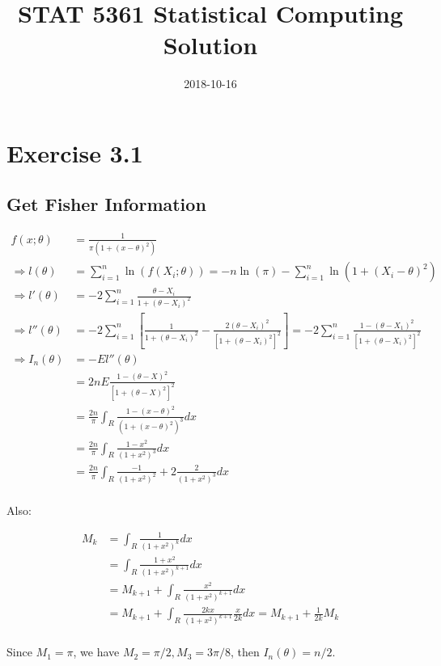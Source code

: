 \documentclass[]{book}
\title{STAT 5361 Statistical Computing Solution}
\author{}
\date{2018-10-16}
\theoremstyle{definition}
\theoremstyle{definition}
\theoremstyle{definition}
\theoremstyle{remark}
\begin{document}
\maketitle

{
\setcounter{tocdepth}{1}
\tableofcontents
}
\chapter{Exercise 3.1}\label{exercise-3.1}

\section{Get Fisher Information}\label{get-fisher-information}

\begin{align*}
f(x;\theta) &= \frac{1}{\pi(1+(x-\theta)^2)}\\
\Rightarrow l(\theta) &= \sum_{i = 1}^n \ln(f(X_i;\theta)) = -n\ln(\pi) - 
\sum_{i = 1}^n\ln(1+(X_i-\theta)^2)\\
\Rightarrow l'(\theta) &= -2\sum_{i = 1}^n\frac{\theta-X_i}{1+(\theta-X_i)^2}\\
\Rightarrow l''(\theta) &= -2\sum_{i = 1}^n[\frac{1}{1+(\theta-X_i)^2} - \frac{2(\theta-X_i)^2}{[1+(\theta - X_i)^2]^2}] = -2\sum_{i = 1}^n\frac{1-(\theta-X_1)^2}{[1+(\theta-X_i)^2]^2}\\
\Rightarrow I_n(\theta) &= -El''(\theta)\\
&= 2nE\frac{1-(\theta - X)^2}{[1+(\theta-X)^2]^2}\\
&=\frac{2n}{\pi}\int_R\frac{1-(x-\theta)^2}{(1+(x-\theta)^2)^3}dx\\
&=\frac{2n}{\pi}\int_R\frac{1-x^2}{(1+x^2)^3}dx\\
&= \frac{2n}{\pi}\int_R\frac{-1}{(1+x^2)^2}+2\frac{2}{(1+x^2)^3}dx\\
\end{align*}

Also:

\begin{align*}
M_k &= \int_R\frac{1}{(1+x^2)^k}dx\\
&= \int_R\frac{1+x^2}{(1+x^2)^{k+1}}dx\\
&= M_{k+1} + \int_R\frac{x^2}{(1+x^2)^{k+1}}dx\\
&= M_{k+1} + \int_R\frac{2kx}{(1+x^2)^{k+1}}\frac{x}{2k}dx = M_{k+1}+\frac{1}{2k}M_k\\
\end{align*}

Since \(M_1 = \pi\), we have \(M_2 = \pi/2, M_3 = 3\pi/8\), then
\(I_n(\theta) = n/2\).
\end{document}
